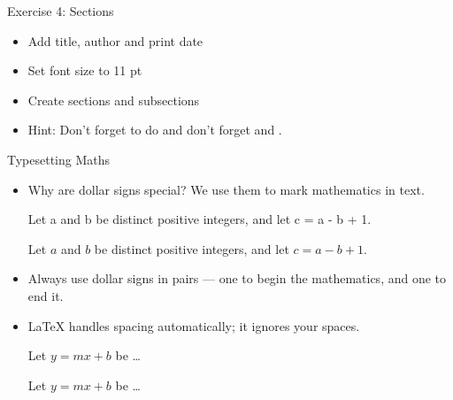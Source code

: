 \documentclass[10pt,times]{beamer}
\begin{document}
\begin{frame}{Exercise 4: Sections}
\begin{itemize}
\item Add title, author and print date
\item Set font size to 11 pt
\item Create sections and subsections
\end{itemize}
\begin{center}
\end{center}

\begin{itemize}
\item Hint: Don't forget to do  and don't forget 
 and 
.
\end{itemize}

\end{frame}


\begin{frame}[fragile]{Typesetting Maths}
\begin{itemize}
\item Why are dollar signs \keys{\$} special? We use them to mark mathematics 
in text.\\[1ex]
\begin{exampletwouptiny}
Let a and b be distinct positive
integers, and let c = a - b + 1.

Let $a$ and $b$ be distinct positive
integers, and let $c = a - b + 1$.
\end{exampletwouptiny}
\item Always use dollar signs in pairs --- one to begin the mathematics, and one
to end it.
\item \LaTeX{} handles spacing automatically; it ignores your spaces.
\begin{exampletwouptiny}
Let $y=mx+b$ be \ldots

Let $y = m x + b$ be \ldots
\end{exampletwouptiny}

\end{itemize}
\end{frame}
\end{document}
